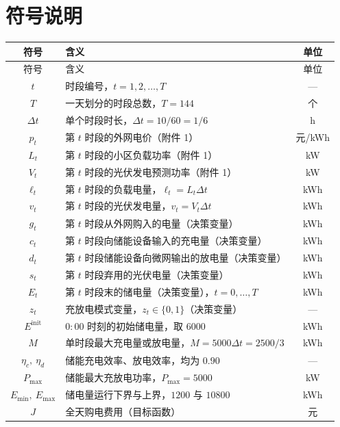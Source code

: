 \documentclass[withoutpreface,bwprint]{cumcmthesis}
\begin{document}
\section{符号说明}

\begingroup
\def\LTcaptype{}
\footnotesize
\begin{longtable}{clc}
  \toprule
  符号 & 含义 & 单位 \\
  \midrule
  \endfirsthead
  \toprule
  符号 & 含义 & 单位 \\
  \midrule
  \endhead
  \bottomrule
  \endlastfoot
  $t$ & 时段编号，$t = 1, 2, \dots, T$ & --- \\
  $T$ & 一天划分的时段总数，$T = 144$ & 个 \\
  $\Delta t$ & 单个时段时长，$\Delta t = 10/60 = 1/6$ & h \\
  $p_t$ & 第 $t$ 时段的外网电价（附件 1） & 元/kWh \\
  $L_t$ & 第 $t$ 时段的小区负载功率（附件 1） & kW \\
  $V_t$ & 第 $t$ 时段的光伏发电预测功率（附件 1） & kW \\
  $\ell_t$ & 第 $t$ 时段的负载电量，$\ell_t = L_t \Delta t$ & kWh \\
  $v_t$ & 第 $t$ 时段的光伏发电量，$v_t = V_t \Delta t$ & kWh \\
  $g_t$ & 第 $t$ 时段从外网购入的电量（决策变量） & kWh \\
  $c_t$ & 第 $t$ 时段向储能设备输入的充电量（决策变量） & kWh \\
  $d_t$ & 第 $t$ 时段储能设备向微网输出的放电量（决策变量） & kWh \\
  $s_t$ & 第 $t$ 时段弃用的光伏电量（决策变量） & kWh \\
  $E_t$ & 第 $t$ 时段末的储电量（决策变量），$t = 0,\dots,T$ & kWh \\
  $z_t$ & 充放电模式变量，$z_t \in \{0,1\}$（决策变量） & --- \\
  $E^{\mathrm{init}}$ & $0{:}00$ 时刻的初始储电量，取 $6000$ & kWh \\
  $M$ & 单时段最大充电量或放电量，$M = 5000 \Delta t = 2500/3$ & kWh \\
  $\eta_c,\ \eta_d$ & 储能充电效率、放电效率，均为 $0.90$ & --- \\
  $P_{\max}$ & 储能最大充放电功率，$P_{\max} = 5000$ & kW \\
  $E_{\min},\ E_{\max}$ & 储电量运行下界与上界，$1200$ 与 $10800$ & kWh \\
  $J$ & 全天购电费用（目标函数） & 元 \\
\end{longtable}
\endgroup
\end{document}
